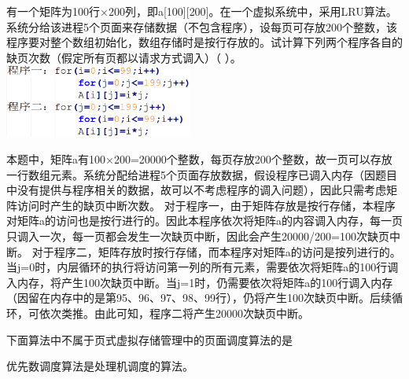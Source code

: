 \question 有一个矩阵为100行×200列，即a{[}100{]}{[}200{]}。在一个虚拟系统中，采用LRU算法。系统分给该进程5个页面来存储数据（不包含程序），设每页可存放200个整数，该程序要对整个数组初始化，数组存储时是按行存放的。试计算下列两个程序各自的缺页次数（假定所有页都以请求方式调入）（
）。\includegraphics[width=2.42708in,height=0.94792in]{computerassets/E52E0CBF83A575BF60173AB625D4B4A7.png}
\par{}
\begin{solution}本题中，矩阵a有100×200=20000个整数，每页存放200个整数，故一页可以存放一行数组元素。系统分配给进程5个页面存放数据，假设程序已调入内存（因题目中没有提供与程序相关的数据，故可以不考虑程序的调入问题），因此只需考虑矩阵访问时产生的缺页中断次数。
对于程序一，由于矩阵存放是按行存储，本程序对矩阵a的访问也是按行进行的。因此本程序依次将矩阵a的内容调入内存，每一页只调入一次，每一页都会发生一次缺页中断，因此会产生20000/200=100次缺页中断。
对于程序二，矩阵存放时按行存储，而本程序对矩阵a的访问是按列进行的。当j=0时，内层循环的执行将访问第一列的所有元素，需要依次将矩阵a的100行调入内存，将产生100次缺页中断。当j=1时，仍需要依次将矩阵a的100行调入内存（因留在内存中的是第95、96、97、98、99行），仍将产生100次缺页中断。后续循环，可依次类推。由此可知，程序二将产生20000次缺页中断。
\end{solution}
\question 下面算法中不属于页式虚拟存储管理中的页面调度算法的是
\par{}
\begin{solution}优先数调度算法是处理机调度的算法。
\end{solution}
